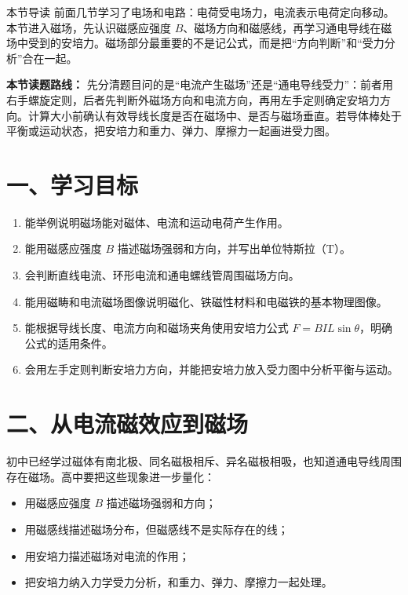 
\begin{learningbox}{本节导读}
前面几节学习了电场和电路：电荷受电场力，电流表示电荷定向移动。本节进入磁场，先认识磁感应强度 $B$、磁场方向和磁感线，再学习通电导线在磁场中受到的安培力。磁场部分最重要的不是记公式，而是把“方向判断”和“受力分析”合在一起。
\end{learningbox}

\textbf{本节读题路线：} 先分清题目问的是“电流产生磁场”还是“通电导线受力”：前者用右手螺旋定则，后者先判断外磁场方向和电流方向，再用左手定则确定安培力方向。计算大小前确认有效导线长度是否在磁场中、是否与磁场垂直。若导体棒处于平衡或运动状态，把安培力和重力、弹力、摩擦力一起画进受力图。

\section*{一、学习目标}
\begin{enumerate}
  \item 能举例说明磁场能对磁体、电流和运动电荷产生作用。
  \item 能用磁感应强度 $B$ 描述磁场强弱和方向，并写出单位特斯拉（$\mathrm{T}$）。
  \item 会判断直线电流、环形电流和通电螺线管周围磁场方向。
  \item 能用磁畴和电流磁场图像说明磁化、铁磁性材料和电磁铁的基本物理图像。
  \item 能根据导线长度、电流方向和磁场夹角使用安培力公式 $F = BIL\sin\theta$，明确公式的适用条件。
  \item 会用左手定则判断安培力方向，并能把安培力放入受力图中分析平衡与运动。
\end{enumerate}
\section*{二、从电流磁效应到磁场}

初中已经学过磁体有南北极、同名磁极相斥、异名磁极相吸，也知道通电导线周围存在磁场。高中要把这些现象进一步量化：
\begin{itemize}
  \item 用磁感应强度 $B$ 描述磁场强弱和方向；
  \item 用磁感线描述磁场分布，但磁感线不是实际存在的线；
  \item 用安培力描述磁场对电流的作用；
  \item 把安培力纳入力学受力分析，和重力、弹力、摩擦力一起处理。
\end{itemize}

